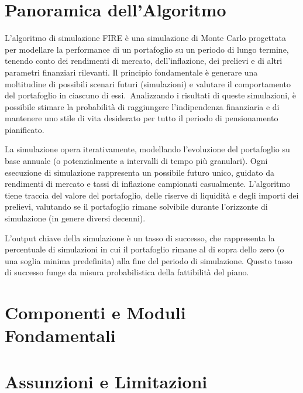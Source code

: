 \documentclass{article}
\begin{document}
    \section{Panoramica dell'Algoritmo}\label{sec:panoramica-dell'algoritmo}

L'algoritmo di simulazione FIRE è una simulazione di Monte Carlo progettata per
modellare la performance di un portafoglio su un periodo di lungo termine,
tenendo conto dei rendimenti di mercato, dell'inflazione, dei prelievi e di
altri parametri finanziari rilevanti.
Il principio fondamentale è generare una
moltitudine di possibili scenari futuri (simulazioni) e valutare il
comportamento del portafoglio in ciascuno di essi.\ Analizzando i risultati di
queste simulazioni, è possibile stimare la probabilità di raggiungere
l'indipendenza finanziaria e di mantenere uno stile di vita desiderato per tutto
il periodo di pensionamento pianificato.

    La simulazione opera iterativamente, modellando l'evoluzione del portafoglio
    su base annuale (o potenzialmente a intervalli di tempo più granulari).
    Ogni
    esecuzione di simulazione rappresenta un possibile futuro unico, guidato da
    rendimenti di mercato e tassi di inflazione campionati casualmente.
    L'algoritmo tiene traccia del valore del portafoglio, delle riserve di
    liquidità e degli importi dei prelievi, valutando se il portafoglio rimane
    solvibile durante l'orizzonte di simulazione (in genere diversi decenni).

    L'output chiave della simulazione è un tasso di successo, che rappresenta la
    percentuale di simulazioni in cui il portafoglio rimane al di sopra dello
    zero (o una soglia minima predefinita) alla fine del periodo di simulazione.
    Questo tasso di successo funge da misura probabilistica della fattibilità
    del piano.

    \section{Componenti e Moduli
    Fondamentali}\label{sec:componenti-e-moduli-fondamentali}
    

    \section{Assunzioni e Limitazioni}\label{sec:assunzioni-e-limitazioni}
\end{document}
